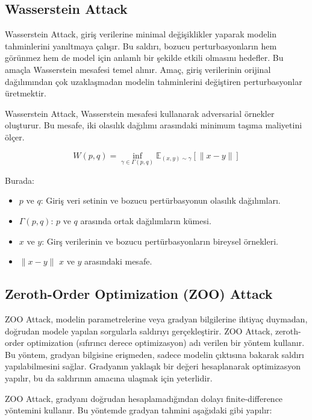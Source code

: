 \newpage

\subsection{Wasserstein Attack}

Wasserstein Attack, giriş verilerine minimal değişiklikler yaparak modelin tahminlerini yanıltmaya çalışır. Bu saldırı, bozucu perturbasyonların hem görünmez hem de model için anlamlı bir şekilde etkili olmasını hedefler. Bu amaçla Wasserstein mesafesi temel alınır. Amaç, giriş verilerinin orijinal dağılımından çok uzaklaşmadan modelin tahminlerini değiştiren perturbasyonlar üretmektir.

Wasserstein Attack, Wasserstein mesafesi kullanarak adversarial örnekler oluşturur. Bu mesafe, iki olasılık dağılımı arasındaki minimum taşıma maliyetini ölçer.

\[ W(p, q) = \inf_{\gamma \in \Gamma(p, q)} \mathbb{E}_{(x, y) \sim \gamma}[\| x - y \|] \]

Burada:

\begin{itemize}
    \item $p$ ve $q$: Giriş veri setinin ve bozucu pertürbasyonun olasılık dağılımları.
    \item $\Gamma(p, q)$: $p$ ve $q$ arasında ortak dağılımların kümesi.
    \item $x$ ve $y$: Girş verilerinin ve bozucu pertürbasyonların bireysel örnekleri.
    \item $\| x - y \|$ $x$ ve $y$ arasındaki mesafe.
\end{itemize}

\newpage

\subsection{Zeroth-Order Optimization (ZOO) Attack}

ZOO Attack, modelin parametrelerine veya gradyan bilgilerine ihtiyaç duymadan, doğrudan modele yapılan sorgularla saldırıyı gerçekleştirir. ZOO Attack, zeroth-order optimization (sıfırıncı derece optimizasyon) adı verilen bir yöntem kullanır. Bu yöntem, gradyan bilgisine erişmeden, sadece modelin çıktısına bakarak saldırı yapılabilmesini sağlar. Gradyanın yaklaşık bir değeri hesaplanarak optimizasyon yapılır, bu da saldırının amacına ulaşmak için yeterlidir.

ZOO Attack, gradyanı doğrudan hesaplamadığından dolayı finite-difference yöntemini kullanır. Bu yöntemde gradyan tahmini aşağıdaki gibi yapılır:

